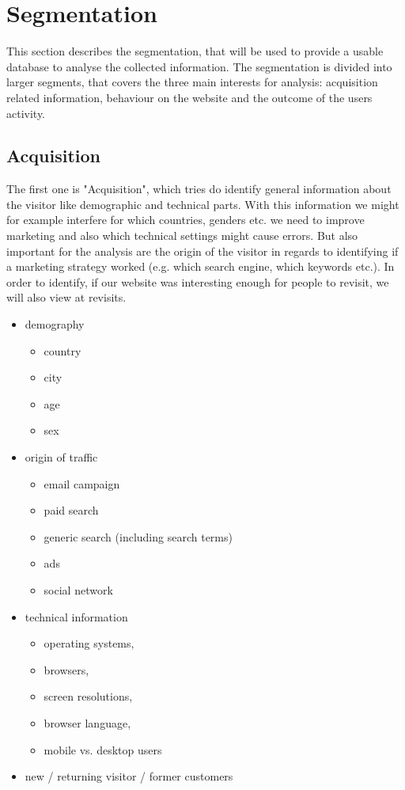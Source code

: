 \section{Segmentation}
\label{sec:Segmentation}

This section describes the segmentation, that will be used to provide a usable database to analyse the collected information. The segmentation is divided into larger segments, that covers the three main interests for analysis: acquisition related information, behaviour on the website and the outcome of the users activity.

\subsection{Acquisition}
The first one is "Acquisition", which tries do identify general information about the visitor like demographic and technical parts. With this information we might for example interfere for which countries, genders etc. we need to improve marketing and also which technical settings might cause errors. But also important for the analysis are the origin of the visitor in regards to identifying if a marketing strategy worked (e.g. which search engine, which keywords etc.). In order to identify, if our website was interesting enough for people to revisit, we will also view at revisits.

\begin{itemize}
\item demography
\begin{itemize}
\item country
\item city
\item age
\item sex
\end{itemize}
\item origin of traffic
\begin{itemize}
\item email campaign
\item paid search
\item generic search (including search terms)
\item ads
\item social network
\end{itemize}
\item technical information
\begin{itemize}
\item operating systems,
\item browsers,
\item screen resolutions,
\item browser language,
\item mobile vs. desktop users
\end{itemize}
\item new / returning visitor /  former customers
\end{itemize}

